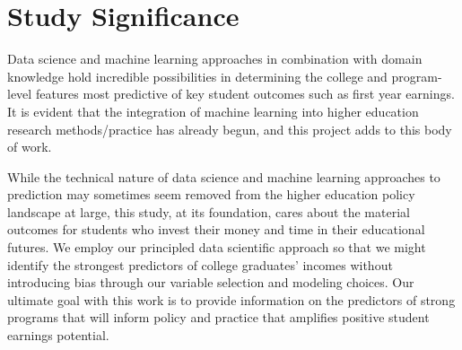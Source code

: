 \documentclass[a4paper, 12pt]{article}
\begin{document}
\section*{Study Significance}

Data science and machine learning approaches in combination with domain knowledge hold incredible possibilities in determining the college and program-level features most predictive of key student outcomes such as first year earnings. It is evident that the integration of machine learning into higher education research methods/practice has already begun, and this project adds to this 
body of work.

While the technical nature of data science and machine learning approaches to prediction may sometimes seem removed from the higher education policy landscape at large, this study, at its foundation, cares about the material outcomes for students who invest their money and time in their educational futures. We employ our principled data scientific approach so that we might identify the strongest predictors of college graduates' incomes without introducing bias through our variable selection and modeling choices. Our ultimate goal with this work is to provide information on the predictors of strong programs that will inform policy and practice that amplifies positive student earnings potential.

\pagebreak
\printbibliography
\end{document}
